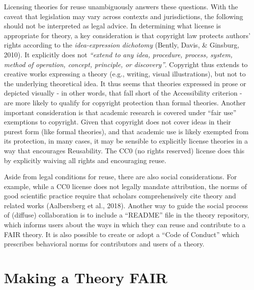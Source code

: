\documentclass[
  man,floatsintext]{apa6}
\begin{document}
Licensing theories for reuse unambiguously answers these questions.
With the caveat that legislation may vary across contexts and jurisdictions, the following should not be interpreted as legal advice.
In determining what license is appropriate for theory,
a key consideration is that copyright law protects authors' rights according to the \emph{idea-expression dichotomy} (Bently, Davis, \& Ginsburg, 2010).
It explicitly does not
\emph{``extend to any idea, procedure, process, system, method of operation, concept, principle, or discovery''}.
Copyright thus extends to creative works expressing a theory (e.g., writing, visual illustrations),
but not to the underlying theoretical idea.
It thus seems that theories expressed in prose or depicted visually - in other words, that fall short of the Accessibility criterion - are more likely to qualify for copyright protection than formal theories.
Another important consideration is that academic research is covered under ``fair use'' exemptions to copyright.
Given that copyright does not cover ideas in their purest form (like formal theories), and that academic use is likely exempted from its protection,
in many cases, it may be sensible to explicitly license theories in a way that encourages Reusability.
The CC0 (no rights reserved) license does this by explicitly waiving all rights and encouraging reuse.

Aside from legal conditions for reuse, there are also social considerations.
For example, while a CC0 license does not legally mandate attribution,
the norms of good scientific practice require that scholars comprehensively cite theory and related works (Aalbersberg et al., 2018).
Another way to guide the social process of (diffuse) collaboration is to include a ``README'' file in the theory repository, which informs users about the ways in which they can reuse and contribute to a FAIR theory.
It is also possible to create or adopt a ``Code of Conduct'' which prescribes behavioral norms for contributors and users of a theory.

\section{Making a Theory FAIR}\label{making-a-theory-fair}
\end{document}
